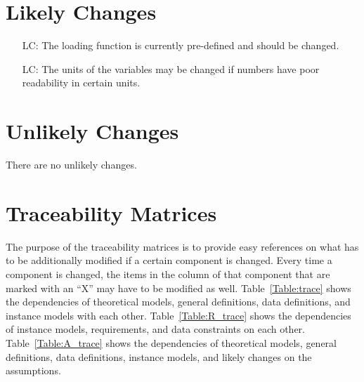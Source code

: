 \documentclass[12pt]{article}
\newcounter{lcnum} %
\begin{document}
\section{Likely Changes}

\noindent\begin{itemize}

    \item[LC\refstepcounter{lcnum}\thelcnum\label{LC_loading}:] The loading
        function is currently pre-defined and should be changed.

    \item[LC\refstepcounter{lcnum}\thelcnum\label{LC_units}:] The units of the
        variables may be changed if numbers have poor readability in certain
        units.

\end{itemize}


\section{Unlikely Changes}

There are no unlikely changes.


\section{Traceability Matrices}

The purpose of the traceability matrices is to provide easy references on what
has to be additionally modified if a certain component is changed.  Every time a
component is changed, the items in the column of that component that are marked
with an ``X'' may have to be modified as well.  Table~\ref{Table:trace} shows
the dependencies of theoretical models, general definitions, data definitions,
and instance models with each other. Table~\ref{Table:R_trace} shows the
dependencies of instance models, requirements, and data constraints on each
other. Table~\ref{Table:A_trace} shows the dependencies of theoretical models,
general definitions, data definitions, instance models, and likely changes on
the assumptions.
\end{document}
